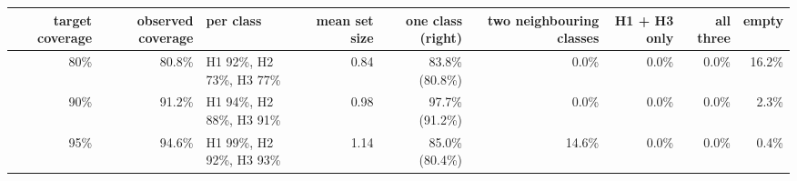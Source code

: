 \begin{adjustbox}{max width=\textwidth}
{\scriptsize
\begin{tabular}{rrp{3.0cm}rrrrrr}
\toprule
\textbf{target coverage} & \textbf{observed coverage} & \textbf{per class} & \textbf{mean set size} & \textbf{one class (right)} & \textbf{two neighbouring classes} & \textbf{H1 + H3 only} & \textbf{all three} & \textbf{empty} \\
\midrule
80\% & 80.8\% & H1 92\%, H2 73\%, H3 77\% & 0.84 & 83.8\% (80.8\%) & 0.0\% & 0.0\% & 0.0\% & 16.2\% \\
90\% & 91.2\% & H1 94\%, H2 88\%, H3 91\% & 0.98 & 97.7\% (91.2\%) & 0.0\% & 0.0\% & 0.0\% & 2.3\% \\
95\% & 94.6\% & H1 99\%, H2 92\%, H3 93\% & 1.14 & 85.0\% (80.4\%) & 14.6\% & 0.0\% & 0.0\% & 0.4\% \\
\bottomrule
\end{tabular}
}
\end{adjustbox}
